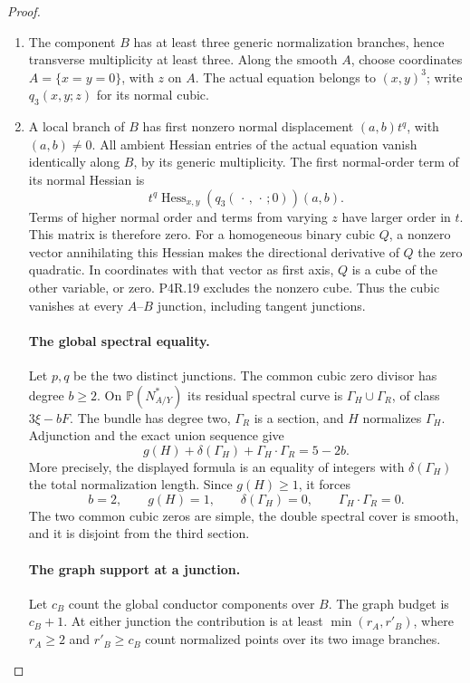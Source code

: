 \begin{proof}

\begin{enumerate}[label={$\langle1\rangle$\arabic*.},leftmargin=*]
\item The component $B$ has at least three generic normalization
branches, hence transverse multiplicity at least three.
Along the smooth $A$, choose coordinates $A=\{x=y=0\}$,
with $z$ on $A$. The actual equation belongs to $(x,y)^3$;
write $q_3(x,y;z)$ for its normal cubic.

\item A local branch of $B$ has first nonzero normal displacement
$(a,b)t^q$, with $(a,b)\ne0$. All ambient Hessian entries
of the actual equation vanish identically along $B$, by
its generic multiplicity. The first normal-order term of
its normal Hessian is
\[
       t^q\operatorname{Hess}_{x,y}
                    (q_3(\,\cdot\,,\,\cdot\,;0))(a,b).
\]
Terms of higher normal order and terms from varying $z$
have larger order in $t$. This matrix is therefore zero.
For a homogeneous binary cubic $Q$, a nonzero vector
annihilating this Hessian makes the directional derivative
of $Q$ the zero quadratic. In coordinates with that vector
as first axis, $Q$ is a cube of the other variable, or zero.
P4R.19 excludes the nonzero cube. Thus the cubic vanishes
at every $A$--$B$ junction, including tangent junctions.

\paragraph{The global spectral equality.}
Let $p,q$ be the two distinct junctions. The common cubic
zero divisor has degree $b\ge2$. On $\mathbb P(N_{A/Y}^*)$
its residual spectral curve is $\Gamma_H\cup\Gamma_R$,
of class $3\xi-bF$. The bundle has degree two, $\Gamma_R$
is a section, and $H$ normalizes $\Gamma_H$. Adjunction
and the exact union sequence give
\[
       g(H)+\delta(\Gamma_H)+\Gamma_H\cdot\Gamma_R=5-2b.
\]
More precisely, the displayed formula is an equality of
integers with $\delta(\Gamma_H)$ the total normalization
length. Since $g(H)\ge1$, it forces
\[
 b=2,\qquad g(H)=1,\qquad \delta(\Gamma_H)=0,
                  \qquad\Gamma_H\cdot\Gamma_R=0.          \tag{4.57a}
\]
The two common cubic zeros are simple, the double spectral
cover is smooth, and it is disjoint from the third section.

\paragraph{The graph support at a junction.}
Let $c_B$ count the global conductor components over $B$.
The graph budget is $c_B+1$. At either junction the
contribution is at least $\min(r_A,r'_B)$, where
$r_A\ge2$ and $r'_B\ge c_B$ count normalized points
over its two image branches.


\end{enumerate}
\end{proof}
